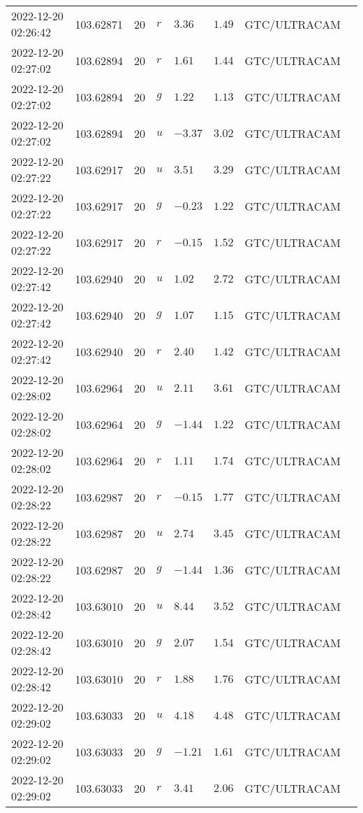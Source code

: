 \documentclass{nature_plusfigure}
\begin{document}
\begin{supplement}
\begin{center}
\begin{longtable}{llllllll}
2022-12-20 02:26:42 & 103.62871 & 20 & $r$ & $3.36$ & $1.49$ & GTC/ULTRACAM &  \\ 
2022-12-20 02:27:02 & 103.62894 & 20 & $r$ & $1.61$ & $1.44$ & GTC/ULTRACAM &  \\ 
2022-12-20 02:27:02 & 103.62894 & 20 & $g$ & $1.22$ & $1.13$ & GTC/ULTRACAM &  \\ 
2022-12-20 02:27:02 & 103.62894 & 20 & $u$ & $-3.37$ & $3.02$ & GTC/ULTRACAM &  \\ 
2022-12-20 02:27:22 & 103.62917 & 20 & $u$ & $3.51$ & $3.29$ & GTC/ULTRACAM &  \\ 
2022-12-20 02:27:22 & 103.62917 & 20 & $g$ & $-0.23$ & $1.22$ & GTC/ULTRACAM &  \\ 
2022-12-20 02:27:22 & 103.62917 & 20 & $r$ & $-0.15$ & $1.52$ & GTC/ULTRACAM &  \\ 
2022-12-20 02:27:42 & 103.62940 & 20 & $u$ & $1.02$ & $2.72$ & GTC/ULTRACAM &  \\ 
2022-12-20 02:27:42 & 103.62940 & 20 & $g$ & $1.07$ & $1.15$ & GTC/ULTRACAM &  \\ 
2022-12-20 02:27:42 & 103.62940 & 20 & $r$ & $2.40$ & $1.42$ & GTC/ULTRACAM &  \\ 
2022-12-20 02:28:02 & 103.62964 & 20 & $u$ & $2.11$ & $3.61$ & GTC/ULTRACAM &  \\ 
2022-12-20 02:28:02 & 103.62964 & 20 & $g$ & $-1.44$ & $1.22$ & GTC/ULTRACAM &  \\ 
2022-12-20 02:28:02 & 103.62964 & 20 & $r$ & $1.11$ & $1.74$ & GTC/ULTRACAM &  \\ 
2022-12-20 02:28:22 & 103.62987 & 20 & $r$ & $-0.15$ & $1.77$ & GTC/ULTRACAM &  \\ 
2022-12-20 02:28:22 & 103.62987 & 20 & $u$ & $2.74$ & $3.45$ & GTC/ULTRACAM &  \\ 
2022-12-20 02:28:22 & 103.62987 & 20 & $g$ & $-1.44$ & $1.36$ & GTC/ULTRACAM &  \\ 
2022-12-20 02:28:42 & 103.63010 & 20 & $u$ & $8.44$ & $3.52$ & GTC/ULTRACAM &  \\ 
2022-12-20 02:28:42 & 103.63010 & 20 & $g$ & $2.07$ & $1.54$ & GTC/ULTRACAM &  \\ 
2022-12-20 02:28:42 & 103.63010 & 20 & $r$ & $1.88$ & $1.76$ & GTC/ULTRACAM &  \\ 
2022-12-20 02:29:02 & 103.63033 & 20 & $u$ & $4.18$ & $4.48$ & GTC/ULTRACAM &  \\ 
2022-12-20 02:29:02 & 103.63033 & 20 & $g$ & $-1.21$ & $1.61$ & GTC/ULTRACAM &  \\ 
2022-12-20 02:29:02 & 103.63033 & 20 & $r$ & $3.41$ & $2.06$ & GTC/ULTRACAM &  \\ 

\end{longtable}
\end{center}
\end{supplement}
\end{document}
